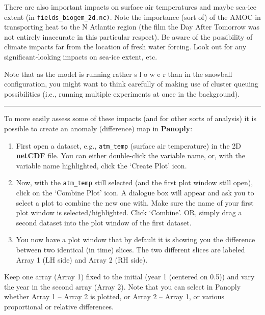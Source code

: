 \documentclass[11pt,fleqn]{book} %
\begin{document}
There are also important impacts on surface air temperatures and maybe sea-ice extent (in \texttt{fields\_biogem\_2d.nc)}. Note the importance (sort of) of the AMOC in transporting heat to the N Atlantic region (the film the Day After Tomorrow was not entirely inaccurate in this particular respect). Be aware of the possibility of climate impacts far from the location of fresh water forcing. Look out for any significant-looking impacts on sea-ice extent, etc.

Note that as the model is running rather s l o w e r than in the snowball configuration, you might want to think carefully of making use of cluster queuing possibilities (i.e., running multiple experiments at once in the background).

\hfill \break
\noindent\rule{4cm}{0.1mm}
\hfill \break

\noindent To more easily assess some of these impacts (and for other sorts of analysis) it is possible to create an anomaly (difference) map in \textbf{Panoply}:

\vspace{1mm}
\begin{enumerate}[noitemsep]
\vspace{1mm}
\item  First open a dataset, e.g., \texttt{atm\_temp} (surface air temperature) in the 2D \textbf{netCDF} file. You can either double-click the variable name, or, with the variable name highlighted, click the ‘Create Plot’ icon.
\vspace{1mm}
\item Now, with the \texttt{atm\_temp} still selected (and the first plot window still open), click on the ‘Combine Plot’ icon. A dialogue box will appear and ask you to select a plot to combine the new one with. Make sure the name of your first plot window is selected/highlighted. Click ‘Combine’. OR, simply drag a second dataset into the plot window of the first dataset.
\vspace{1mm}
\item You now have a plot window that by default it is showing you the difference between two identical (in time) slices. The two different slices are labeled Array 1 (LH side) and Array 2 (RH side).
\end{enumerate}
\vspace{1mm}

Keep one array (Array 1) fixed to the initial (year 1 (centered on 0.5)) and vary the year in the second array (Array 2). Note that you can select in Panoply whether Array 1 – Array 2 is plotted, or Array 2 – Array 1, or various proportional or relative differences.
\end{document}
